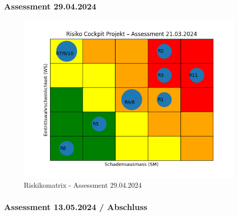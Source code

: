 \begin{flushleft}
    \clearpage
    \recalctypearea
    \subsubsection{Assessment 29.04.2024}
    
\end{flushleft}
\begin{flushleft}
    \clearpage
    \recalctypearea
    \begin{figure}[H]
        \centering
        \includegraphics[width=0.75\linewidth]{source/riskmatrix/project-assessment-29-04-2024}
        \caption{Riskikomatrix - Assessment 29.04.2024}
        \label{fig:project-assessment-29-04-2024}
    \end{figure}
\end{flushleft}
\clearpage
{}
\recalctypearea
\begin{flushleft}
    \subsubsection{Assessment 13.05.2024 / Abschluss}
\end{flushleft}